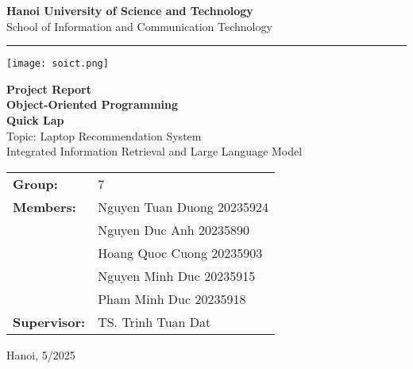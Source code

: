 \documentclass{article}
\begin{document}
\begin{titlepage}
    \centering
    \vspace{0.5cm} %
    {\LARGE\bfseries Hanoi University of Science and Technology}\\[0.5em]
    {\Large School of Information and Communication Technology}

    \vspace{0.2cm}
    \rule{\textwidth}{0.4pt}
    \vspace{2.5cm}

    \centering
    \texttt{[image: soict.png]} %


    \vspace{2cm} %

    {\huge\bfseries Project Report}\\[0.5em]
    {\LARGE\bfseries Object-Oriented Programming}\\[1em]

    {\LARGE\bfseries Quick Lap}\\[1em]

    {\Large Topic: Laptop Recommendation System}\\[0.5em]
    {\large Integrated Information Retrieval and Large Language Model}

    \vfill %

    \begin{tabular}{@{}ll}
        \textbf{Group:}      & 7 \\
        \addlinespace[0.5em]
        \textbf{Members:}    & Nguyen Tuan Duong \hspace{2em} 20235924 \\
                             & Nguyen Duc Anh \hspace{2.7em} 20235890 \\ %
                             & Hoang Quoc Cuong \hspace{1.9em} 20235903 \\
                             & Nguyen Minh Duc \hspace{2em} 20235915 \\
                             & Pham Minh Duc \hspace{2.7em} 20235918 \\
        \addlinespace[0.5em]
        \textbf{Supervisor:} & TS. Trinh Tuan Dat
    \end{tabular}
    \vfill
    \vspace{1cm} 
    {\large Hanoi, 5/2025}
\end{titlepage}
\end{document}
